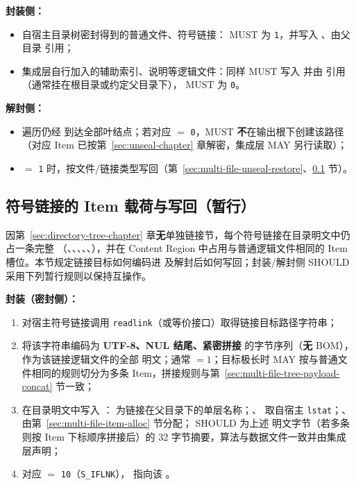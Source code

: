 \textbf{封装侧：}
\begin{itemize}
  \item 自宿主目录树密封得到的普通文件、符号链接： MUST 为 \texttt{1}，并写入 、由父目录  引用；
  \item 集成层自行加入的辅助索引、说明等逻辑文件：同样 MUST 写入  并由  引用（通常挂在根目录或约定父目录下）， MUST 为 \texttt{0}。
\end{itemize}

\textbf{解封侧：}
\begin{itemize}
  \item 遍历仍经  到达全部叶结点；若对应  $=$ \texttt{0}，MUST \textbf{不}在输出根下创建该路径（对应 Item 已按第~\ref{sec:unseal-chapter} 章解密，集成层 MAY 另行读取）；
  \item {} $=$ \texttt{1} 时，按文件/链接类型写回（第~\ref{sec:multi-file-unseal-restore}、\ref{sec:multi-file-symlink} 节）。
\end{itemize}

\subsection{符号链接的 Item 载荷与写回（暂行）}\label{sec:multi-file-symlink}

因第~\ref{sec:directory-tree-chapter} 章\textbf{无}单独链接节，每个符号链接在目录明文中仍占一条完整 （、、、、、），并在 Content Region 中占用与普通逻辑文件相同的 Item 槽位。本节规定链接目标如何编码进  及解封后如何写回；封装/解封侧 SHOULD 采用下列暂行规则以保持互操作。

\textbf{封装（密封侧）：}
\begin{enumerate}
  \item 对宿主符号链接调用 \texttt{readlink}（或等价接口）取得链接目标路径字符串；
  \item 将该字符串编码为 \textbf{UTF-8、NUL 结尾、紧密拼接} 的字节序列（\textbf{无} BOM），作为该链接逻辑文件的全部  明文；通常  $= 1$；目标极长时 MAY 按与普通文件相同的规则切分为多条 Item，拼接规则与第~\ref{sec:multi-file-tree-payload-concat} 节一致；
  \item 在目录明文中写入 ： 为链接在父目录下的单层名称；、 取自宿主 \texttt{lstat}；、 由第~\ref{sec:multi-file-item-alloc} 节分配； SHOULD 为上述  明文字节（若多条则按 Item 下标顺序拼接后）的 32 字节摘要，算法与数据文件一致并由集成层声明；
  \item 对应  $=$ \texttt{10}（\texttt{S\_IFLNK}）， 指向该 。
\end{enumerate}

